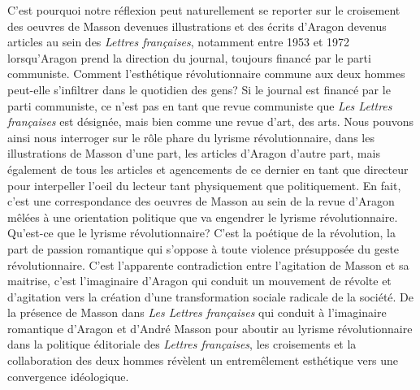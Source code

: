 C’est pourquoi notre réflexion peut naturellement se reporter sur le croisement des oeuvres de Masson devenues illustrations et des écrits d’Aragon devenus articles au sein des \emph{Lettres françaises}, notamment entre 1953 et 1972 lorsqu’Aragon prend la direction du journal, toujours financé par le parti communiste. Comment l’esthétique révolutionnaire commune aux deux hommes peut-elle s’infiltrer dans le quotidien des gens? Si le journal est financé par le parti communiste, ce n’est pas en tant que revue communiste que \emph{Les Lettres françaises} est désignée, mais bien comme une revue d’art, des arts. Nous pouvons ainsi nous interroger sur le rôle phare du lyrisme révolutionnaire, dans les illustrations de Masson d’une part, les articles d’Aragon d’autre part, mais également de tous les articles et agencements de ce dernier en tant que directeur pour interpeller l’oeil du lecteur tant physiquement que politiquement. En fait, c’est une correspondance des oeuvres de Masson au sein de la revue d’Aragon mêlées à une orientation politique que va engendrer le lyrisme révolutionnaire. Qu’est-ce que le lyrisme révolutionnaire? C’est la poétique de la révolution, la part de passion romantique qui s’oppose à toute violence présupposée du geste révolutionnaire. C’est l’apparente contradiction entre l’agitation de Masson et sa maitrise, c’est l’imaginaire d’Aragon qui conduit un mouvement de révolte et d’agitation vers la création d’une transformation sociale radicale de la société. De la présence de Masson dans \emph{Les Lettres françaises} qui conduit à l’imaginaire romantique d’Aragon et d’André Masson pour aboutir au lyrisme révolutionnaire dans la politique éditoriale des \emph{Lettres françaises}, les croisements et la collaboration des deux hommes révèlent un entremêlement esthétique vers une convergence idéologique. 